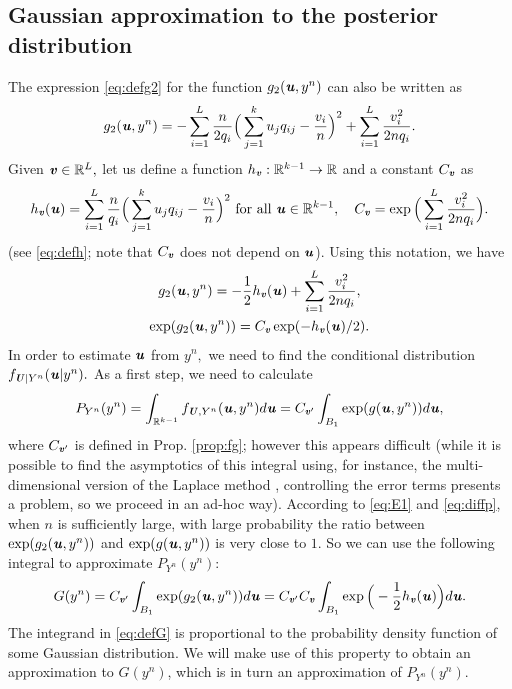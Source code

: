 \documentclass[11pt,onecolumn]{IEEEtran}
\def\mathbi#1{{\textbf{\textit #1}}}
\begin{document}
\subsection{Gaussian approximation to the posterior distribution }
The expression \eqref{eq:defg2} for the function $g_2(\mathbi{u},y^n)$ can also be written as
\begin{align*}
g_2(\mathbi{u},y^n) = - \sum_{i=1}^L \frac{n}{2q_i} \Big(\sum_{j=1}^k u_j q_{ij} - \frac{v_i}{n} \Big)^2
 + \sum_{i=1}^L \frac{v_i^2}{2n q_i}.
\end{align*}
Given $\mathbi{v} \in \mathbb{R}^L,$ let us define a function $h_{\mathbi{v}}: \mathbb{R}^{k-1} \to \mathbb{R}$ and a constant $C_{\mathbi{v}}$ as
\begin{equation}\label{eq:hvcv}
h_{\mathbi{v}}(\mathbi{u}) = \sum_{i=1}^L \frac{n}{q_i} \Big(\sum_{j=1}^k u_j q_{ij} - \frac{v_i}{n} \Big)^2 \text{~for all~} \mathbi{u} \in \mathbb{R}^{k-1}, \quad
C_{\mathbi{v}}=\exp\Big(\sum_{i=1}^L \frac{v_i^2}{2n q_i} \Big).
\end{equation}
(see \eqref{eq:defh}; note that $C_\mathbi{v}$ does not depend on $\mathbi{u}$). Using this notation, we have
\begin{gather}\label{eq:g2}
g_2(\mathbi{u},y^n) = - \frac{1}{2} h_{\mathbi{v}}(\mathbi{u})
 + \sum_{i=1}^L \frac{v_i^2}{2n q_i}, \\
\exp(g_2(\mathbi{u},y^n)) = C_{\mathbi{v}} \exp ( -  h_{\mathbi{v}}(\mathbi{u})/2 ).\nonumber
\end{gather}
In order to estimate $\mathbi{u}$ from $y^n,$ we need to find the conditional distribution $f_{\mathbi{U}|Y^n}(\mathbi{u}|y^n).$ As a first step, we need to calculate 
$$
P_{Y^n}(y^n)= \int_{\mathbb{R}^{k-1}} f_{\mathbi{U},Y^n}(\mathbi{u},y^n) d\mathbi{u}
=C_{\mathbi{v}'} \int_{ B_1}   \exp(g(\mathbi{u},y^n)) d\mathbi{u},
$$
where $C_{\mathbi{v}'}$ is defined in Prop. \ref{prop:fg};
however this appears difficult (while it is possible to find the asymptotics of this integral using, for instance,
the multi-dimensional version of the Laplace method \cite{Wong2001}, controlling the error terms presents a problem, so we proceed in an ad-hoc way). According to \eqref{eq:E1} and \eqref{eq:diffp}, when $n$ is sufficiently large, with large probability the ratio between $\exp(g_2(\mathbi{u},y^n))$ and $\exp(g(\mathbi{u},y^n))$ is very close to $1.$ So we can use the following integral to approximate $P_{Y^n}(y^n)$:
\begin{equation}\label{eq:defG}
G(y^n)  = C_{\mathbi{v}'}  \int_{ B_1} \exp(g_2(\mathbi{u},y^n)) d\mathbi{u} = C_{\mathbi{v}'}  C_{\mathbi{v}}  \int_{ B_1} 
\exp\Big( - \frac{1}{2} h_{\mathbi{v}}(\mathbi{u}) \Big) d\mathbi{u}.
\end{equation}
The integrand in \eqref{eq:defG} is proportional to the probability density function of some Gaussian distribution. We will make use of this property to obtain an approximation to $G(y^n)$, which is in turn an approximation of $P_{Y^n}(y^n).$
\end{document}
